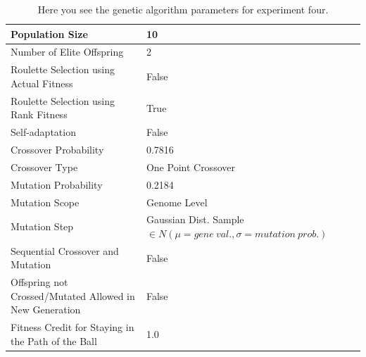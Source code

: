 \documentclass[a4paper,10pt]{article}
\begin{document}
\begin{table}[H]
\centering
\footnotesize
\begin{tabular}{ |>{\columncolor[gray]{0.8}} l | l| }
\hline
Population Size                                                      & 10                                                                           \\ \hline
Number of Elite Offspring                                            & 2                                                                            \\ \hline
Roulette Selection using Actual Fitness                              & False                                                                        \\ \hline
Roulette Selection using Rank Fitness                                & True                                                                         \\ \hline
Self-adaptation                                                      & False                                                                        \\ \hline
Crossover Probability                                                & 0.7816                                                                       \\ \hline
Crossover Type                                                       & One Point Crossover                                                          \\ \hline
Mutation Probability                                                 & 0.2184                                                                       \\ \hline
Mutation Scope                                                       & Genome Level                                                                 \\ \hline
Mutation Step                                                        & Gaussian Dist. Sample $\in N(\mu=gene \ val., \sigma = mutation \ prob.)$    \\ \hline
Sequential Crossover and Mutation                                    & False                                                      	             \\ \hline
Offspring not Crossed/Mutated Allowed in New Generation              & False                                                     	                  \\ \hline
Fitness Credit for Staying in the Path of the Ball                   & 1.0                                                      	                  \\ \hline
\end{tabular}
\caption{Here you see the genetic algorithm parameters for experiment four.}
\label{tab:exp4}
\end{table}
\end{document}

